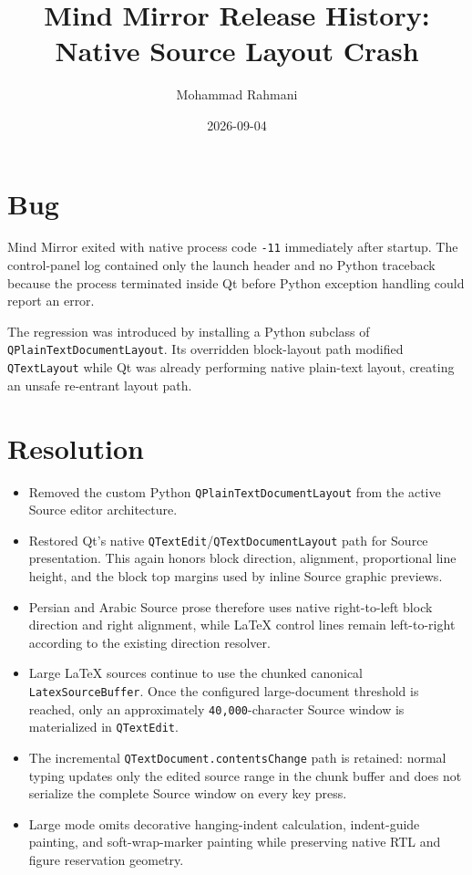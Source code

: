 \documentclass[a4paper]{article}
\title{Mind Mirror Release History: Native Source Layout Crash}
\date{2026-09-04}
\author{Mohammad Rahmani}
\begin{document}
   \maketitle

   \section{Bug}
   Mind Mirror exited with native process code \texttt{-11} immediately after
   startup. The control-panel log contained only the launch header and no Python
   traceback because the process terminated inside Qt before Python exception
   handling could report an error.

   The regression was introduced by installing a Python subclass of
   \texttt{QPlainTextDocumentLayout}. Its overridden block-layout path modified
   \texttt{QTextLayout} while Qt was already performing native plain-text layout,
   creating an unsafe re-entrant layout path.

   \section{Resolution}
   \begin{itemize}
      \item Removed the custom Python \texttt{QPlainTextDocumentLayout} from the
      active Source editor architecture.
      \item Restored Qt's native \texttt{QTextEdit}/\texttt{QTextDocumentLayout}
      path for Source presentation. This again honors block direction, alignment,
      proportional line height, and the block top margins used by inline Source
      graphic previews.
      \item Persian and Arabic Source prose therefore uses native right-to-left
      block direction and right alignment, while LaTeX control lines remain
      left-to-right according to the existing direction resolver.
      \item Large LaTeX sources continue to use the chunked canonical
      \texttt{LatexSourceBuffer}. Once the configured large-document threshold is
      reached, only an approximately \texttt{40,000}-character Source window is
      materialized in \texttt{QTextEdit}.
      \item The incremental \texttt{QTextDocument.contentsChange} path is retained:
      normal typing updates only the edited source range in the chunk buffer and
      does not serialize the complete Source window on every key press.
      \item Large mode omits decorative hanging-indent calculation, indent-guide
      painting, and soft-wrap-marker painting while preserving native RTL and
      figure reservation geometry.
   \end{itemize}
\end{document}
